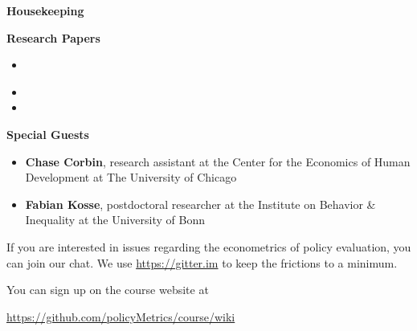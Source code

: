\begin{frame}\begin{center}
\LARGE\textbf{Housekeeping}
\end{center}\end{frame}
\begin{frame}\textbf{Research Papers}


\begin{itemize}
\item {}
\end{itemize}

{\scriptsize\begin{itemize}\setlength\itemsep{0.5em}
\item {}
\item {}
\end{itemize}}


\end{frame}
\begin{frame}\textbf{Special Guests}

\begin{itemize}\setlength\itemsep{0.5em}
\item \textbf{Chase Corbin}, research assistant at the Center for the Economics of Human Development at The University of Chicago
\item \textbf{Fabian Kosse}, postdoctoral researcher at the Institute on Behavior \& Inequality at the University of Bonn
\end{itemize}
\end{frame}
\begin{frame}
If you are interested in issues regarding the econometrics of policy evaluation, you can join our chat. We use \href{gitter.im}{https://gitter.im} to keep the frictions to a minimum.\\\vspace{0.3cm}

You can sign up on the course website at

\begin{center}
\url{https://github.com/policyMetrics/course/wiki}
\end{center}
\end{frame}
